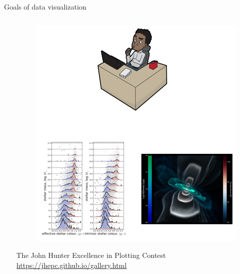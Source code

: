 \documentclass[aspectratio=169]{../latex_main/tntbeamer}  %
\begin{document}
\begin{frame}[c]{Goals of data visualization}
\begin{columns}
\begin{column}{.6\textwidth}
	     \end{column}
	    \begin{column}{.4\textwidth}
	        \begin{figure}
	            \centering
        	    \includegraphics[scale=.4]{Bild10}
	        \end{figure}
        	    The John Hunter Excellence in Plotting Contest\\
                \small \url{https://jhepc.github.io/gallery.html} 
	    
	    \end{column}
	    \end{columns}

	\end{frame}
	
	
	
\end{document}
